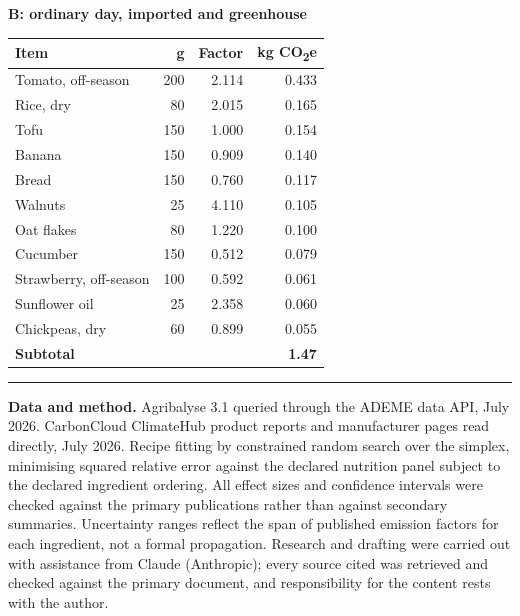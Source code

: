 \documentclass[11pt,a4paper]{article}
\newcommand{\co}{CO\textsubscript{2}e}
\begin{document}
\begin{minipage}[t]{0.485\textwidth}
\footnotesize
\textbf{B: ordinary day, imported and greenhouse}\\[0.3em]
\begin{tabular}{@{}lrrr@{}}
\toprule
Item & g & Factor & kg \co{} \\
\midrule
Tomato, off-season & 200 & 2.114 & 0.433 \\
Rice, dry & 80 & 2.015 & 0.165 \\
Tofu & 150 & 1.000 & 0.154 \\
Banana & 150 & 0.909 & 0.140 \\
Bread & 150 & 0.760 & 0.117 \\
Walnuts & 25 & 4.110 & 0.105 \\
Oat flakes & 80 & 1.220 & 0.100 \\
Cucumber & 150 & 0.512 & 0.079 \\
Strawberry, off-season & 100 & 0.592 & 0.061 \\
Sunflower oil & 25 & 2.358 & 0.060 \\
Chickpeas, dry & 60 & 0.899 & 0.055 \\
\midrule
\textbf{Subtotal} & & & \textbf{1.47} \\
\bottomrule
\end{tabular}
\end{minipage}

\vspace{1.0em}
\noindent\textcolor{rule}{\rule{\textwidth}{0.6pt}}
\vspace{0.3em}

{\footnotesize\color{srcgrey}
\textbf{Data and method.} Agribalyse 3.1 queried through the ADEME data API, July
2026. CarbonCloud ClimateHub product reports and manufacturer pages read directly,
July 2026. Recipe fitting by constrained random search over the simplex, minimising
squared relative error against the declared nutrition panel subject to the declared
ingredient ordering. All effect sizes and confidence intervals were checked against
the primary publications rather than against secondary summaries. Uncertainty ranges
reflect the span of published emission factors for each ingredient, not a formal
propagation. Research and drafting were carried out with assistance from Claude
(Anthropic); every source cited was retrieved and checked against the primary
document, and responsibility for the content rests with the author.}
\end{document}
